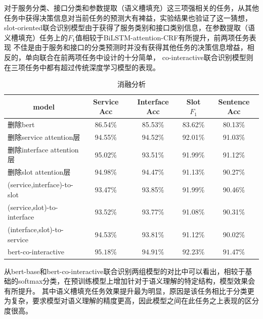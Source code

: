 对于服务分类、接口分类和参数提取（语义槽填充）这三项强相关的任务，从其他任务中获得决策信息对当前任务的预测大有裨益，实验结果也验证了这一猜想，
slot-oriented联合识别模型由于获得了服务类别和接口类别信息，在参数提取（语义槽填充）任务上的$F_1$值相较于BiLSTM-attention-CRF有所提升，前两项任务表现
不佳是由于服务和接口的分类预测时并没有获得其他任务的决策信息增益，相反的，单向联合在前两项任务中设计的十分简单，
co-interactive联合识别模型则在三项任务中都有超过传统深度学习模型的表现。
\begin{table}[htb]
  \centering
  \caption{消融分析}
  \label{tab:xiaorongjieguo}
\begin{tabular}{l|cccc}
  \toprule
  \multicolumn{1}{c|}{\centering model}&Service Acc&Interface Acc&Slot $F_1$&Sentence Acc\\
 \hline
 删除bert&86.54\%&85.53\%&83.62\%&80.13\%\\
 删除service attention层&94.55\%&94.52\%&92.01\%&91.03\%\\
 删除interface attention层&95.02\%&93.51\%&91.99\%&91.12\%\\
 删除slot attention层&94.98\%&94.47\%&91.13\%&90.27\%\\
 (service,interface)-to-slot&93.47\%&93.85\%&91.99\%&90.46\%\\
 (service,slot)-to-interface&93.52\%&93.77\%&91.08\%&90.31\%\\
 (interface,slot)-to-service&94.53\%&93.81\%&91.12\%&90.02\%\\
 bert-co-interactive&$\mathbf{95.18\%}$&$\mathbf{94.91}\%$&$\mathbf{92.23}\%$&$\mathbf{91.47}\%$\\
\bottomrule
\end{tabular}
\end{table}
从bert-base和bert-co-interactive联合识别两组模型的对比中可以看出，相较于基础的softmax分类，在预训练模型上增加针对于语义理解的特定结构，模型效果会有所提升。
其中语义槽填充任务效果提升最为明显，原因是该任务相比于分类更为复杂，要求模型对语义理解的精度更高，因此模型之间在此任务之上表现的区分度很高。

